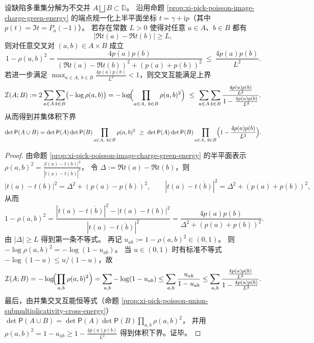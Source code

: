 \begin{proposition}\label{prop:xi-pick-poisson-cross-energy-horizontal-separation-bound}
设缺陷多重集分解为不交并 \(A\bigsqcup B\subset\mathbb D\)。
沿用命题 \ref{prop:xi-pick-poisson-image-charge-green-energy} 的端点规一化上半平面坐标 \(t=\gamma+\mathrm{i}p\)（其中 \(p(t)=\Im t=P_a(-1)\)）。
若存在常数 \(L>0\) 使得对任意 \(a\in A\)、\(b\in B\) 都有
\[
|\Re t(a)-\Re t(b)|\ge L,
\]
则对任意交叉对 \((a,b)\in A\times B\) 成立
\[
1-\rho(a,b)^2
=\frac{4p(a)p(b)}{(\Re t(a)-\Re t(b))^2+(p(a)+p(b))^2}
\ \le\ \frac{4p(a)p(b)}{L^2}.
\]
若进一步满足
\(
\max_{a\in A,\ b\in B}\frac{4p(a)p(b)}{L^2}<1
\)，则交叉互能满足上界
\[
\mathcal I(A;B)
:=2\sum_{a\in A}\sum_{b\in B}\bigl(-\log\rho(a,b)\bigr)
=-\log\!\Bigl(\prod_{a\in A,\ b\in B}\rho(a,b)^2\Bigr)
\ \le\
\sum_{a\in A}\sum_{b\in B}
\frac{\tfrac{4p(a)p(b)}{L^2}}{1-\tfrac{4p(a)p(b)}{L^2}}.
\]
从而得到并集体积下界
\[
\det\mathsf P(A\cup B)
=\det\mathsf P(A)\det\mathsf P(B)\prod_{a\in A,\ b\in B}\rho(a,b)^2
\ \ge\
\det\mathsf P(A)\det\mathsf P(B)\prod_{a\in A,\ b\in B}\Bigl(1-\frac{4p(a)p(b)}{L^2}\Bigr).
\]
\end{proposition}
\begin{proof}
由命题 \ref{prop:xi-pick-poisson-image-charge-green-energy} 的半平面表示
\(
\rho(a,b)^2=\frac{|t(a)-t(b)|^2}{|t(a)-\overline{t(b)}|^2}
\)，
令 \(\Delta:=\Re t(a)-\Re t(b)\)，则
\[
|t(a)-t(b)|^2=\Delta^2+(p(a)-p(b))^2,\qquad
|t(a)-\overline{t(b)}|^2=\Delta^2+(p(a)+p(b))^2,
\]
从而
\[
1-\rho(a,b)^2
=\frac{|t(a)-\overline{t(b)}|^2-|t(a)-t(b)|^2}{|t(a)-\overline{t(b)}|^2}
=\frac{4p(a)p(b)}{\Delta^2+(p(a)+p(b))^2}.
\]
由 \(|\Delta|\ge L\) 得到第一条不等式。
再记 \(u_{ab}:=1-\rho(a,b)^2\in(0,1)\)。
则
\(
-\log\rho(a,b)^2=-\log(1-u_{ab})
\)。
当 \(u\in(0,1)\) 时有标准不等式 \(-\log(1-u)\le u/(1-u)\)，故
\[
\mathcal I(A;B)
=-\log\!\Bigl(\prod_{a,b}\rho(a,b)^2\Bigr)
=\sum_{a,b}-\log(1-u_{ab})
\le \sum_{a,b}\frac{u_{ab}}{1-u_{ab}}
\le \sum_{a,b}\frac{\tfrac{4p(a)p(b)}{L^2}}{1-\tfrac{4p(a)p(b)}{L^2}}.
\]
最后，由并集交叉互能恒等式（命题 \ref{prop:xi-pick-poisson-union-submultiplicativity-cross-energy}）
\(
\det\mathsf P(A\cup B)=\det\mathsf P(A)\det\mathsf P(B)\prod_{a,b}\rho(a,b)^2
\)，
并用 \(\rho(a,b)^2=1-u_{ab}\ge 1-\tfrac{4p(a)p(b)}{L^2}\) 得到体积下界。证毕。
\end{proof}

